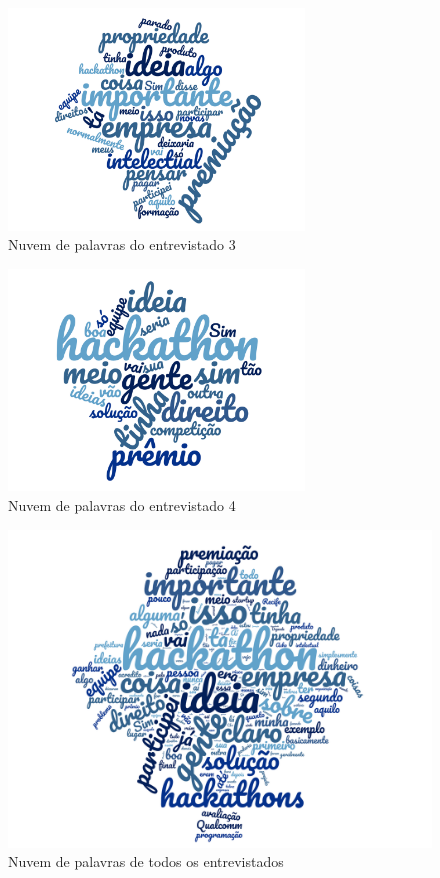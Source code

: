 \begin{figure}[H]
    \centering
    \includegraphics[width=0.7\textwidth]{appendix/wordcloud3.png}
    \caption{Nuvem de palavras do entrevistado 3}%
    \label{fig:nuvem-3}
\end{figure}

\begin{figure}[H]
    \centering
    \includegraphics[width=0.7\textwidth]{appendix/wordcloud4.png}
    \caption{Nuvem de palavras do entrevistado 4}%
    \label{fig:nuvem-4}
\end{figure}

\begin{figure}[H]
    \centering
    \includegraphics[width=1\textwidth]{appendix/wordcloudTODOS.png}
    \caption{Nuvem de palavras de todos os entrevistados}%
    \label{fig:nuvem-todos}
\end{figure}